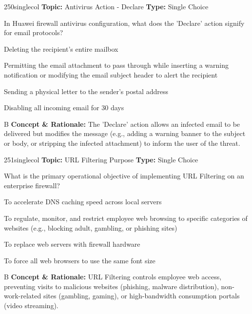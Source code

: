 \begin{qcard}{250}{singlecol}
\textcolor{darkslate!75}{\small\textbf{Topic:} Antivirus Action - Declare \hfill \textbf{Type:} Single Choice}\vspace{0.4em}\par
In Huawei firewall antivirus configuration, what does the 'Declare' action signify for email protocols?
\begin{qoptions}
\item Deleting the recipient's entire mailbox
\item Permitting the email attachment to pass through while inserting a warning notification or modifying the email subject header to alert the recipient
\item Sending a physical letter to the sender's postal address
\item Disabling all incoming email for 30 days
\end{qoptions}
\end{qcard}
\nopagebreak
\begin{explainbox}{B}
\textbf{Concept \& Rationale:} The 'Declare' action allows an infected email to be delivered but modifies the message (e.g., adding a warning banner to the subject or body, or stripping the infected attachment) to inform the user of the threat.
\end{explainbox}

\begin{qcard}{251}{singlecol}
\textcolor{darkslate!75}{\small\textbf{Topic:} URL Filtering Purpose \hfill \textbf{Type:} Single Choice}\vspace{0.4em}\par
What is the primary operational objective of implementing URL Filtering on an enterprise firewall?
\begin{qoptions}
\item To accelerate DNS caching speed across local servers
\item To regulate, monitor, and restrict employee web browsing to specific categories of websites (e.g., blocking adult, gambling, or phishing sites)
\item To replace web servers with firewall hardware
\item To force all web browsers to use the same font size
\end{qoptions}
\end{qcard}
\nopagebreak
\begin{explainbox}{B}
\textbf{Concept \& Rationale:} URL Filtering controls employee web access, preventing visits to malicious websites (phishing, malware distribution), non-work-related sites (gambling, gaming), or high-bandwidth consumption portals (video streaming).
\end{explainbox}

